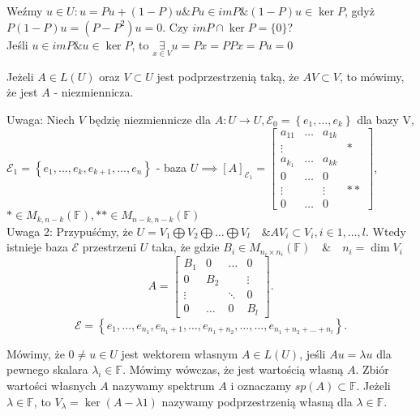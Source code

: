 \documentclass[../main.tex]{subfiles}
\begin{document}
\begin{dowod}
    Weźmy $u\in U: u = Pu + (1-P)u \& Pu\in im P \& (1-P)u\in \ker P$, gdyż $P(1-P)u = (P-P^2)u = 0$. Czy  $im P \cap \ker P = \{0\}$?\\
    Jeśli  $u\in im P \& u\in \ker P$, to $\underset{x\in V}{\exists} u = Px = P Px = Pu = 0$
\end{dowod}
\begin{definicja}
    Jeżeli $A\in L(U)$ oraz $V\subset U$ jest podprzestrzenią taką, że $A V \subset V$, to mówimy, że jest $A$ - niezmiennicza.
\end{definicja}
Uwaga: Niech $V$ będzię niezmiennicze dla $A: U\to U, \mathcal{E}_0 = \left\{ e_1,...,e_k \right\} $ dla bazy V, $\mathcal{E}_1 = \left\{ e_1,...,e_k,e_{k+1},\ldots,e_n \right\} $ - baza $U \implies [A]_{\mathcal{E}_1} = \begin{bmatrix} a_{11} & \ldots & a_{1k} & \\ \vdots & & &* \\ a_{k_1} & \ldots & a_{kk} & \\ 0 & \ldots & 0 & \\ \vdots &  & \vdots & ** \\ 0 & \ldots & 0 &\end{bmatrix}$,\\
$*\in M_{k,n-k}(\mathbb{F}), **\in M_{n-k,n-k}(\mathbb{F}) $\\
Uwaga 2:
Przypuśćmy, że $U = V_1 \bigoplus V_2 \bigoplus \ldots \bigoplus V_l \quad \& A V_i \subset V_i, i\in 1,\ldots,l$. Wtedy istnieje baza $\mathcal{E}$ przestrzeni $U$ taka, że gdzie $B_i\in M_{n_i \times n_i}(\mathbb{F}) \quad \& \quad n_i = \dim V_i$
\[
    A = \begin{bmatrix} B_1 & 0 & \ldots & 0 \\ 0 & B_2 & & \vdots \\ \vdots & & \ddots & 0 \\ 0 & \ldots & 0 & B_l \end{bmatrix}
.\]
\[
    \mathcal{E} = \left\{ e_1,\ldots, e_{n_1}, e_{n_1+1}, \ldots, e_{n_1+n_2}, \ldots, \ldots, e_{n_1+n_2+\ldots+n_l} \right\}
.\]
\begin{definicja}
    Mówimy, że $0\neq u\in U$ jest wektorem własnym $A \in L(U)$, jeśli $A u = \lambda u$ dla pewnego skalara $\lambda_i \in \mathbb{F}$. Mówimy wówczas, że jest wartością własną $A$. Zbiór wartości własnych $A$ nazywamy spektrum $A$ i oznaczamy $sp(A) \subset \mathbb{F}$. Jeżeli $\lambda\in\mathbb{F}$, to $V_\lambda = \ker(A - \lambda 1)$ nazywamy podprzestrzenią własną dla $\lambda\in \mathbb{F}$.
\end{definicja}
\end{document}
